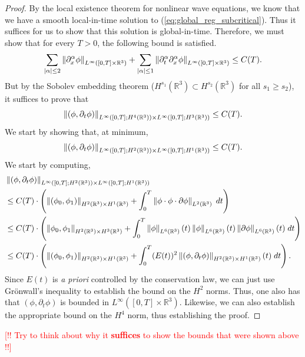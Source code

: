 \documentclass{article}
\begin{document}
\begin{proof}
	By the local existence theorem for nonlinear wave equations, we know that we have a smooth local-in-time solution to (\ref{eq:global_reg_subcritical}). Thus it suffices for us to show that this solution is global-in-time. Therefore, we must show that for every $T > 0$, the following bound is satisfied. 
	\begin{equation*}
		\sum_{|\alpha|\leq 2}\left\Vert \partial_{x}^{\alpha}\phi \right\Vert_{L^{\infty}([0,T]\times \mathbb{R}^{3})} +  \sum_{|\alpha|\leq 1}\left\Vert \partial_{t}^{\alpha}\partial_{x}^{\alpha}\phi \right\Vert_{L^{\infty}([0,T] \times \mathbb{R}^{3})} \leq C(T). 
	\end{equation*}
	But by the Sobolev embedding theorem ($H^{s_{1}}(\mathbb{R}^{3}) \subset H^{s_{2}}(\mathbb{R}^{3})$ for all $s_{1}\geq s_{2}$), it suffices to prove that 
	\begin{equation*}
		\left\Vert (\phi, \partial_{t}\phi) \right\Vert_{L^{\infty}([0,T]; H^{4}(\mathbb{R}^{3})) \times L^{\infty}([0,T];H^{3}(\mathbb{R}^{3}))} \leq C(T). 
	\end{equation*}
	We start by showing that, at minimum, 
	$$\left\Vert (\phi, \partial_{t}\phi) \right\Vert_{L^{\infty}([0,T]; H^{2}(\mathbb{R}^{3})) \times L^{\infty}([0,T];H^{1}(\mathbb{R}^{3}))} \leq C(T).$$ 
	We start by computing, 
	\begin{align*}
		\begin{split}
			&\left\Vert (\phi, \partial_{t}\phi) \right\Vert_{L^{\infty}([0,T]; H^{2}(\mathbb{R}^{3})) \times L^{\infty}([0,T];H^{1}(\mathbb{R}^{3}))} \\
			&\leq C(T) \cdot \left(\left\Vert (\phi_{0},\phi_{1}) \right\Vert_{H^{2}(\mathbb{R}^{3}) \times H^{1}(\mathbb{R}^{3})} + \int_{0}^{T}\left\Vert \phi \cdot \phi \cdot \partial\phi \right\Vert_{L^{2}(\mathbb{R}^{3})}\;dt\right) \\
			&\leq C(T)\cdot \left(\left\Vert \phi_{0}, \phi_{1} \right\Vert_{H^{2}(\mathbb{R}^{3}) \times H^{3}(\mathbb{R}^{3})} + \int_{0}^{T}\left\Vert \phi \right\Vert_{L^{6}(\mathbb{R}^{3})}(t)\left\Vert \phi \right\Vert_{L^{6}(\mathbb{R}^{3})}(t)\left\Vert \partial\phi \right\Vert_{L^{6}(\mathbb{R}^{3})}(t)\;dt\right) \\
			&\leq C(T)\cdot \left(\left\Vert (\phi_{0},\phi_{1}) \right\Vert_{H^{2}(\mathbb{R}^{3})\times H^{1}(\mathbb{R}^{3})} + \int_{0}^{T}(E(t))^{2}\left\Vert (\phi,\partial_{t}\phi) \right\Vert_{H^{2}(\mathbb{R}^{3}) \times H^{1}(\mathbb{R}^{3})}(t)\;dt\right). 
		\end{split}
	\end{align*} 
	Since $E(t)$ is \textit{a priori} controlled by the conservation law, we can just use Gr\"onwall's inequality to establish the bound on the $H^{2}$ norms. Thus, one also has that $(\phi,\partial_{t}\phi)$ is bounded in $L^{\infty}([0,T] \times \mathbb{R}^{3})$. Likewise, we can also establish the appropriate bound on the $H^{4}$ norm, thus establishing the proof. 
\end{proof} 
\textcolor{red}{[!! Try to think about why it \textbf{suffices} to show the bounds that were shown above !!]}
\end{document}
